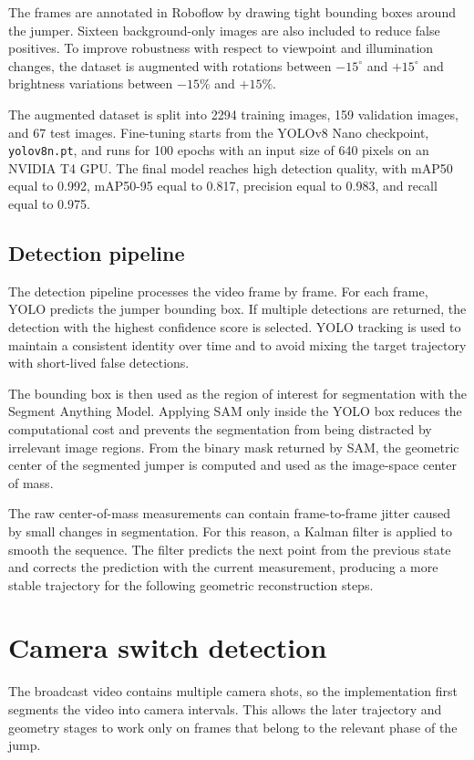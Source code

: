 The frames are annotated in Roboflow by drawing tight bounding boxes around the jumper. Sixteen background-only images are also included to reduce false positives. To improve robustness with respect to viewpoint and illumination changes, the dataset is augmented with rotations between \(-15^\circ\) and \(+15^\circ\) and brightness variations between \(-15\%\) and \(+15\%\).

The augmented dataset is split into 2294 training images, 159 validation images, and 67 test images. Fine-tuning starts from the YOLOv8 Nano checkpoint, \texttt{yolov8n.pt}, and runs for 100 epochs with an input size of 640 pixels on an NVIDIA T4 GPU. The final model reaches high detection quality, with mAP50 equal to 0.992, mAP50-95 equal to 0.817, precision equal to 0.983, and recall equal to 0.975.

\subsection{Detection pipeline}
The detection pipeline processes the video frame by frame. For each frame, YOLO predicts the jumper bounding box. If multiple detections are returned, the detection with the highest confidence score is selected. YOLO tracking is used to maintain a consistent identity over time and to avoid mixing the target trajectory with short-lived false detections.

The bounding box is then used as the region of interest for segmentation with the Segment Anything Model. Applying SAM only inside the YOLO box reduces the computational cost and prevents the segmentation from being distracted by irrelevant image regions. From the binary mask returned by SAM, the geometric center of the segmented jumper is computed and used as the image-space center of mass.

The raw center-of-mass measurements can contain frame-to-frame jitter caused by small changes in segmentation. For this reason, a Kalman filter is applied to smooth the sequence. The filter predicts the next point from the previous state and corrects the prediction with the current measurement, producing a more stable trajectory for the following geometric reconstruction steps.

\section{Camera switch detection}
The broadcast video contains multiple camera shots, so the implementation first segments the video into camera intervals. This allows the later trajectory and geometry stages to work only on frames that belong to the relevant phase of the jump.

